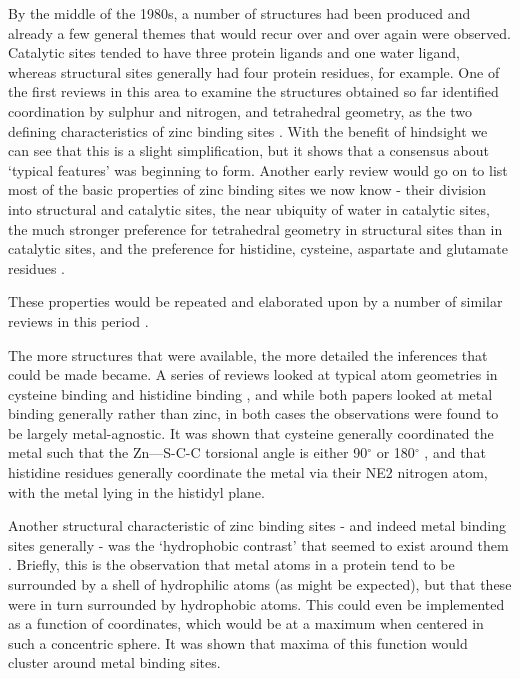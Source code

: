 By the middle of the 1980s, a number of structures had been produced and already a few general themes that would recur over and over again were observed. Catalytic sites tended to have three protein ligands and one water ligand, whereas structural sites generally had four protein residues, for example. One of the first reviews in this area to examine the structures obtained so far identified coordination by sulphur and nitrogen, and tetrahedral geometry, as the two defining characteristics of zinc binding sites \cite{williams1987biochemistry}. With the benefit of hindsight we can see that this is a slight simplification, but it shows that a consensus about `typical features' was beginning to form. Another early review would go on to list most of the basic properties of zinc binding sites we now know - their division into structural and catalytic sites, the near ubiquity of water in catalytic sites, the much stronger preference for tetrahedral geometry in structural sites than in catalytic sites, and the preference for histidine, cysteine, aspartate and glutamate residues \cite{vallee1990zinc}.

These properties would be repeated and elaborated upon by a number of similar reviews in this period \cite{tainer1991metal,vallee1992functional,coleman1992zinc}.

The more structures that were available, the more detailed the inferences that could be made became. A series of reviews looked at typical atom geometries in cysteine binding \cite{chakrabarti1989geometry} and histidine binding \cite{chakrabarti1990geometry}, and while both papers looked at metal binding generally rather than zinc, in both cases the observations were found to be largely metal-agnostic. It was shown that cysteine generally coordinated the metal such that the Zn---S-C-C torsional angle is either 90$^\circ$ or 180$^\circ$ , and that histidine residues generally coordinate the metal via their NE2 nitrogen atom, with the metal lying in the histidyl plane.

Another structural characteristic of zinc binding sites - and indeed metal binding sites generally - was the `hydrophobic contrast' that seemed to exist around them \cite{yamashita1990metal,gregory1993prediction}. Briefly, this is the observation that metal atoms in a protein tend to be surrounded by a shell of hydrophilic atoms (as might be expected), but that these were in turn surrounded by hydrophobic atoms. This could even be implemented as a function of coordinates, which would be at a maximum when centered in such a concentric sphere. It was shown that maxima of this function would cluster around metal binding sites.

